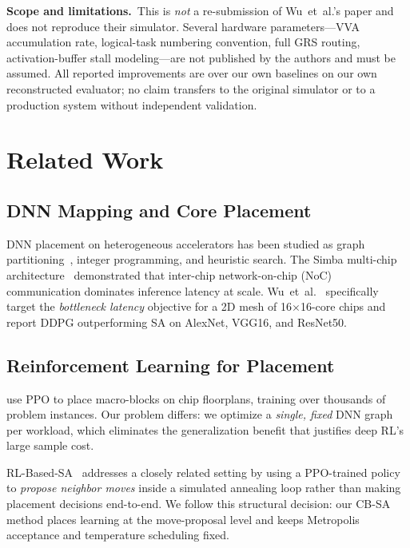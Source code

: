\documentclass[10pt,conference]{IEEEtran}
\begin{document}
\textbf{Scope and limitations.}\
This is \emph{not} a re-submission of Wu~et~al.'s paper and does not reproduce
their simulator.  Several hardware parameters---VVA accumulation rate,
logical-task numbering convention, full GRS routing, activation-buffer stall
modeling---are not published by the authors and must be assumed.  All reported
improvements are over our own baselines on our own reconstructed evaluator; no
claim transfers to the original simulator or to a production system without
independent validation.

\section{Related Work}
\label{sec:related}

\subsection{DNN Mapping and Core Placement}

DNN placement on heterogeneous accelerators has been studied as graph
partitioning~\cite{mirhoseini2021graphplacement}, integer programming, and
heuristic search.  The Simba multi-chip architecture~\cite{shao2019simba}
demonstrated that inter-chip network-on-chip (NoC) communication dominates
inference latency at scale.  Wu~et~al.~\cite{wu2020todaes} specifically target
the \emph{bottleneck latency} objective for a 2D mesh of 16$\times$16-core
chips and report DDPG outperforming SA on AlexNet, VGG16, and ResNet50.

\subsection{Reinforcement Learning for Placement}

\citet{mirhoseini2021graphplacement} use PPO to place macro-blocks on chip
floorplans, training over thousands of problem instances.  Our problem differs:
we optimize a \emph{single, fixed} DNN graph per workload, which eliminates
the generalization benefit that justifies deep RL's large sample cost.

RL-Based-SA~\cite{rl_based_sa_2025} addresses a closely related setting by
using a PPO-trained policy to \emph{propose neighbor moves} inside a simulated
annealing loop rather than making placement decisions end-to-end.  We follow
this structural decision: our CB-SA method places learning at the move-proposal
level and keeps Metropolis acceptance and temperature scheduling fixed.
\end{document}
